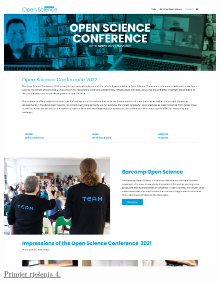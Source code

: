 \begin{figure}[H]
\begin{minipage}[t]{0.4\textwidth}
				\includegraphics[width=\linewidth]{slike/frontpage_example4}
				\caption{\href{https://www.open-science-conference.eu/}{Primjer rješenja 4.}} \label{fig:frontpage_example4}
			\end{minipage}
		\end{figure}
		
